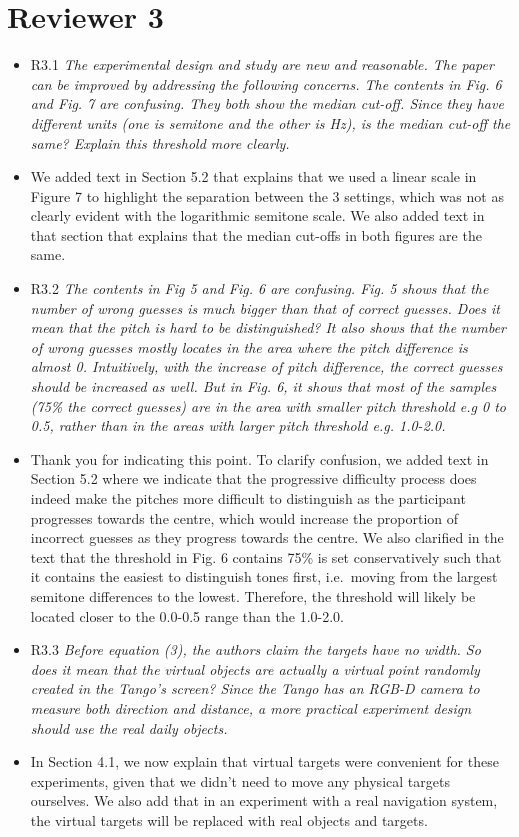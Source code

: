 \documentclass{scrartcl}
\begin{document}
\section*{Reviewer 3}

\begin{itemize}
  \item R3.1 \textit{The experimental design and study are new and reasonable. The paper can be improved by addressing the following concerns. The contents in Fig. 6 and Fig. 7 are confusing. They both show the median cut-off. Since they have different units (one is semitone and the other is Hz), is the median cut-off the same? Explain this threshold more clearly.}
  \item[] We added text in Section 5.2 that explains that we used a linear scale in Figure 7 to highlight the separation between the 3 settings, which was not as clearly evident with the logarithmic semitone scale.
    We also added text in that section that explains that the median cut-offs in both figures are the same.

  \item R3.2 \textit{The contents in Fig 5 and Fig. 6 are confusing. Fig. 5 shows that the number of wrong guesses is much bigger than that of correct guesses. Does it mean that the pitch is hard to be distinguished? It also shows that the number of wrong guesses mostly locates in the area where the pitch difference is almost 0. Intuitively, with the increase of pitch difference, the correct guesses should be increased as well. But in Fig. 6, it shows that most of the samples (75\% the correct guesses) are in the area with smaller pitch threshold e.g 0 to 0.5, rather than in the areas with larger pitch threshold e.g. 1.0-2.0.}
  \item[] Thank you for indicating this point.
    To clarify confusion, we added text in Section 5.2 where we indicate that the progressive difficulty process does indeed make the pitches more difficult to distinguish as the participant progresses towards the centre, which would increase the proportion of incorrect guesses as they progress towards the centre.
    We also clarified in the text that the threshold in Fig. 6 contains 75\% is set conservatively such that it contains the easiest to distinguish tones first, i.e.\ moving from the largest semitone differences to the lowest.
    Therefore, the threshold will likely be located closer to the 0.0-0.5 range than the 1.0-2.0. 

  \item R3.3 \textit{Before equation (3), the authors claim the targets have no width. So does it mean that the virtual objects are actually a virtual point randomly created in the Tango’s screen? Since the Tango has an RGB-D camera to measure both direction and distance, a more practical experiment design should use the real daily objects.}
  \item[] In Section 4.1, we now explain that virtual targets were convenient for these experiments, given that we didn't need to move any physical targets ourselves.
    We also add that in an experiment with a real navigation system, the virtual targets will be replaced with real objects and targets.


\end{itemize}
\end{document}
